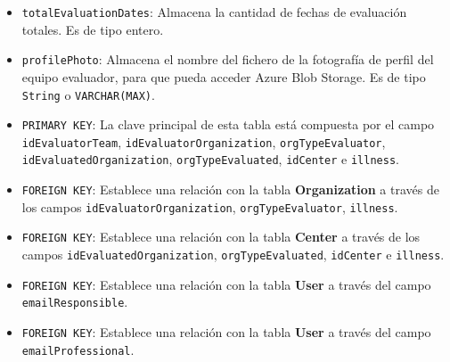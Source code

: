 \begin{itemize}
\begin{itemize}
        \item \texttt{totalEvaluationDates}: Almacena la cantidad de fechas de evaluación totales. Es de tipo entero.
        \item \texttt{profilePhoto}: Almacena el nombre del fichero de la fotografía de perfil del equipo evaluador, para que pueda acceder Azure Blob Storage. Es de tipo \texttt{String} o \texttt{VARCHAR(MAX)}.
        \item \texttt{PRIMARY KEY}: La clave principal de esta tabla está compuesta por el campo \texttt{idEvaluatorTeam}, \texttt{idEvaluatorOrganization}, \texttt{orgTypeEvaluator}, \texttt{idEvaluatedOrganization}, \texttt{orgTypeEvaluated}, \texttt{idCenter} e \texttt{illness}.
        \item \texttt{FOREIGN KEY}: Establece una relación con la tabla \textbf{Organization} a través de los campos \texttt{idEvaluatorOrganization}, \texttt{orgTypeEvaluator}, \texttt{illness}.
        \item \texttt{FOREIGN KEY}: Establece una relación con la tabla \textbf{Center} a través de los campos \texttt{idEvaluatedOrganization}, \texttt{orgTypeEvaluated}, \texttt{idCenter} e \texttt{illness}.
        \item \texttt{FOREIGN KEY}: Establece una relación con la tabla \textbf{User} a través del campo \texttt{emailResponsible}.
        \item \texttt{FOREIGN KEY}: Establece una relación con la tabla \textbf{User} a través del campo \texttt{emailProfessional}.
        \end{itemize}

    
\end{itemize}
